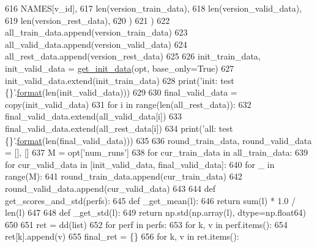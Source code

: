 \begin{DoxyCode}
616                 NAMES[v\_id],
617                 len(version\_train\_data),
618                 len(version\_valid\_data),
619                 len(version\_rest\_data),
620             )
621         )
622         all\_train\_data.append(version\_train\_data)
623         all\_valid\_data.append(version\_valid\_data)
624         all\_rest\_data.append(version\_rest\_data)
625 
626     init\_train\_data, init\_valid\_data = \hyperlink{namespaceprojects_1_1mastering__the__dungeon_1_1mturk_1_1tasks_1_1MTD_1_1run_ae84843b54586b020d47c60d95340e1d7}{get\_init\_data}(opt, base\_only=\textcolor{keyword}{True})
627     init\_valid\_data.extend(init\_train\_data)
628     print(\textcolor{stringliteral}{'init: test \{\}'}.\hyperlink{namespaceparlai_1_1chat__service_1_1services_1_1messenger_1_1shared__utils_a32e2e2022b824fbaf80c747160b52a76}{format}(len(init\_valid\_data)))
629 
630     final\_valid\_data = copy(init\_valid\_data)
631     \textcolor{keywordflow}{for} i \textcolor{keywordflow}{in} range(len(all\_rest\_data)):
632         final\_valid\_data.extend(all\_valid\_data[i])
633         final\_valid\_data.extend(all\_rest\_data[i])
634     print(\textcolor{stringliteral}{'all: test \{\}'}.\hyperlink{namespaceparlai_1_1chat__service_1_1services_1_1messenger_1_1shared__utils_a32e2e2022b824fbaf80c747160b52a76}{format}(len(final\_valid\_data)))
635 
636     round\_train\_data, round\_valid\_data = [], []
637     M = opt[\textcolor{stringliteral}{'num\_runs'}]
638     \textcolor{keywordflow}{for} cur\_train\_data \textcolor{keywordflow}{in} all\_train\_data:
639         \textcolor{keywordflow}{for} cur\_valid\_data \textcolor{keywordflow}{in} [init\_valid\_data, final\_valid\_data]:
640             \textcolor{keywordflow}{for} \_ \textcolor{keywordflow}{in} range(M):
641                 round\_train\_data.append(cur\_train\_data)
642                 round\_valid\_data.append(cur\_valid\_data)
643 
644     \textcolor{keyword}{def }get\_scores\_and\_std(perfs):
645         \textcolor{keyword}{def }\_get\_mean(l):
646             \textcolor{keywordflow}{return} sum(l) * 1.0 / len(l)
647 
648         \textcolor{keyword}{def }\_get\_std(l):
649             \textcolor{keywordflow}{return} np.std(np.array(l), dtype=np.float64)
650 
651         ret = dd(list)
652         \textcolor{keywordflow}{for} perf \textcolor{keywordflow}{in} perfs:
653             \textcolor{keywordflow}{for} k, v \textcolor{keywordflow}{in} perf.items():
654                 ret[k].append(v)
655         final\_ret = \{\}
656         \textcolor{keywordflow}{for} k, v \textcolor{keywordflow}{in} ret.items():

\end{DoxyCode}
